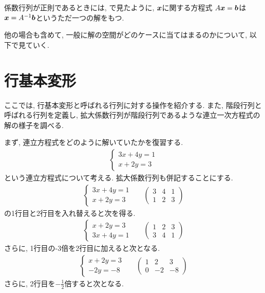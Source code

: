 係数行列が正則であるときには,
で見たように,
$\boldsymbol{x}$に関する方程式
$A\boldsymbol{x}=\boldsymbol{b}$は
$\boldsymbol{x}=A^{-1}\boldsymbol{b}$というただ一つの解をもつ.

他の場合も含めて,
一般に解の空間がどのケースに当てはまるのかについて,
以下で見ていく.

\section{行基本変形}
ここでは, 行基本変形と呼ばれる行列に対する操作を紹介する.
また, 階段行列と呼ばれる行列を定義し,
拡大係数行列が階段行列であるような連立一次方程式の解の様子を調べる.

まず, 連立方程式をどのように解いていたかを復習する.
\begin{align*}
  \begin{cases}
    3x+4y=1\\
    x+2y=3
  \end{cases}
\end{align*}
という連立方程式について考える.
拡大係数行列も併記することにする.
\begin{align*}
  \begin{cases}
    3x+4y=1\\
    x+2y=3
  \end{cases}&&
  \begin{pmatrix}
    3&4&1\\
    1&2&3    
  \end{pmatrix}
\end{align*}
の1行目と2行目を入れ替えると次を得る.
\begin{align*}
  \begin{cases}
    x+2y=3\\
    3x+4y=1
  \end{cases}&&
  \begin{pmatrix}
    1&2&3\\    
    3&4&1
  \end{pmatrix}
\end{align*}
さらに,
1行目の-3倍を2行目に加えると次となる.
\begin{align*}
  \begin{cases}
    x+2y=3\\
     -2y=-8
  \end{cases}&&
  \begin{pmatrix}
    1&2&3\\    
    0&-2&-8
  \end{pmatrix}
\end{align*}
さらに,
2行目を$-\frac{1}{2}$倍すると次となる.
